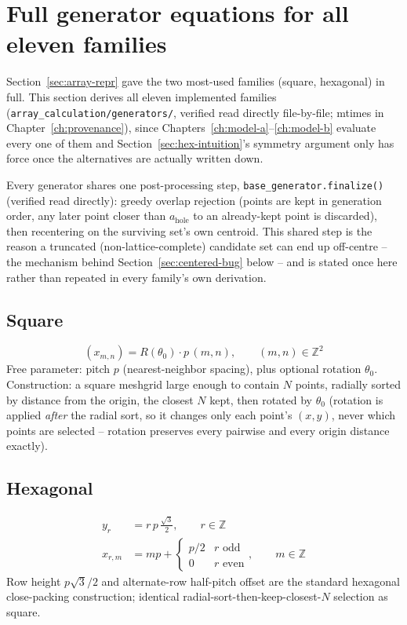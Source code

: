 \section{Full generator equations for all eleven families}
\label{sec:all-generators}
Section~\ref{sec:array-repr} gave the two most-used families (square, hexagonal) in
full. This section derives all eleven implemented families
(\texttt{array\_calculation/generators/}, verified read directly file-by-file; mtimes
in Chapter~\ref{ch:provenance}), since Chapters~\ref{ch:model-a}--\ref{ch:model-b}
evaluate every one of them and Section~\ref{sec:hex-intuition}'s symmetry argument only
has force once the alternatives are actually written down.

Every generator shares one post-processing step, \texttt{base\_generator.finalize()}
(verified read directly): greedy overlap rejection (points are kept in generation
order, any later point closer than $a_{\mathrm{hole}}$ to an already-kept point is
discarded), then recentering on the surviving set's own centroid. This shared step is
the reason a truncated (non-lattice-complete) candidate set can end up off-centre --
the mechanism behind Section~\ref{sec:centered-bug} below -- and is stated once here
rather than repeated in every family's own derivation.

\subsection{Square}
\begin{equation}
(x_{m,n}) = R(\theta_0)\cdot p\,(m,n), \qquad (m,n)\in\mathbb{Z}^2
\end{equation}
Free parameter: pitch $p$ (nearest-neighbor spacing), plus optional rotation
$\theta_0$. Construction: a square meshgrid large enough to contain $N$ points,
radially sorted by distance from the origin, the closest $N$ kept, then rotated by
$\theta_0$ (rotation is applied \emph{after} the radial sort, so it changes only each
point's $(x,y)$, never which points are selected -- rotation preserves every pairwise
and every origin distance exactly).

\subsection{Hexagonal}
\begin{align}
y_r &= r\,p\,\frac{\sqrt3}{2}, \qquad r\in\mathbb{Z} \\
x_{r,m} &= mp + \begin{cases}p/2 & r\text{ odd}\\0&r\text{ even}\end{cases}, \qquad m\in\mathbb{Z}
\end{align}
Row height $p\sqrt3/2$ and alternate-row half-pitch offset are the standard hexagonal
close-packing construction; identical radial-sort-then-keep-closest-$N$ selection as
square.


